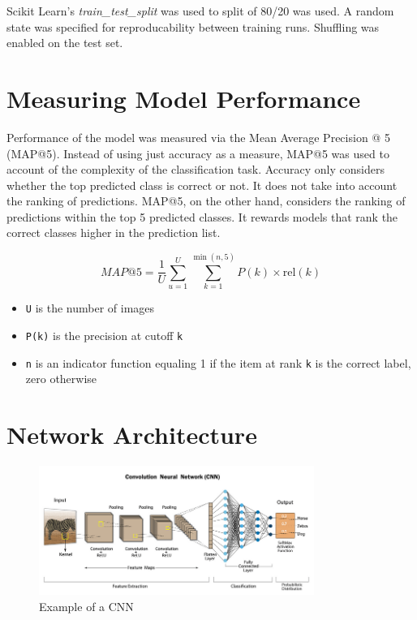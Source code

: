 \documentclass{article}
\begin{document}
Scikit Learn's \emph{train\_test\_split} was used to split of 80/20 was used. A random state was specified for reproducability between training runs. Shuffling was enabled on the test set.

\section{Measuring Model Performance}

Performance of the model was measured via the Mean Average Precision @ 5 (MAP@5). Instead of using just accuracy as a measure, MAP@5 was used to account of the complexity of the
classification task. Accuracy only considers whether the top predicted class is correct or not. It does not take into account the ranking of predictions. 
MAP@5, on the other hand, considers the ranking of predictions within the top 5 predicted classes. It rewards models that rank the correct classes higher in the prediction list.

$$MAP@5 = \frac{1}{U} \sum_{u=1}^{U} \sum_{k=1}^{\min(n,5)} P(k) \times \text{rel}(k)$$

\begin{itemize}
    \item \verb|U| is the number of images 
    \item \verb|P(k)| is the precision at cutoff \verb|k|
    \item \verb|n| is an indicator function equaling 1 if the item at rank \verb|k| is the correct label, zero otherwise
\end{itemize}


\section{Network Architecture}

\begin{figure}
    \centering
    \includegraphics[width=0.8\textwidth]{cnn.png}
    \caption{Example of a CNN}
    \label{fig:network_architecture}
\end{figure}
\end{document}
